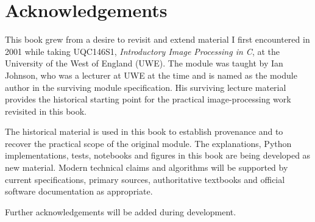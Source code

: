\chapter*{Acknowledgements}

This book grew from a desire to revisit and extend material I first encountered
in 2001 while taking UQC146S1, \emph{Introductory Image Processing in C}, at
the University of the West of England (UWE). The module was taught by Ian
Johnson, who was a lecturer at UWE at the time and is named as the module author
in the surviving module specification\cite{uwe_uqc146_spec}. His surviving
lecture material provides the historical starting point for the practical
image-processing work revisited in this book\cite{johnson_uqc146_intro}.

The historical material is used in this book to establish provenance and to
recover the practical scope of the original module. The explanations, Python
implementations, tests, notebooks and figures in this book are being developed
as new material. Modern technical claims and algorithms will be supported by
current specifications, primary sources, authoritative textbooks and official
software documentation as appropriate.

Further acknowledgements will be added during development.
